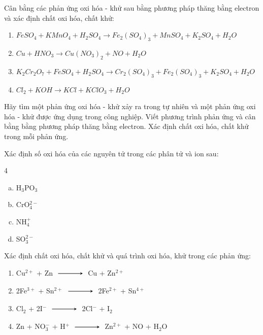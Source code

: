 	\begin{bt}%
		Cân bằng các phản ứng oxi hóa - khử sau bằng phương pháp thăng bằng electron và xác định chất oxi hóa, chất khử:
		\begin{enumerate}
			\item $FeSO_4 + KMnO_4 + H_2SO_4 \longrightarrow Fe_2(SO_4)_3 + MnSO_4 + K_2SO_4 + H_2O$
			\item $Cu + HNO_3 \longrightarrow Cu(NO_3)_2 + NO + H_2O$
			\item $K_2Cr_2O_7 + FeSO_4 + H_2SO_4 \longrightarrow Cr_2(SO_4)_3 + Fe_2(SO_4)_3 + K_2SO_4 + H_2O$
			\item $Cl_2 + KOH \longrightarrow KCl + KClO_3 + H_2O$
		\end{enumerate}
	\end{bt}
	\begin{bt}%
		Hãy tìm một phản ứng oxi hóa - khử xảy ra trong tự nhiên và một phản ứng oxi hóa - khử được ứng dụng trong công nghiệp. Viết phương trình phản ứng và cân bằng bằng phương pháp thăng bằng electron. Xác định chất oxi hóa, chất khử trong mỗi phản ứng.
	\end{bt}
	\begin{bt}%
		Xác định số oxi hóa của các nguyên tử trong các phân tử và ion sau:
		\begin{multicols}{4}
			\begin{enumerate}[a)]
				\item H$_3$PO$_3$
				\item CrO$_4^{2-}$
				\item NH$_4^+$
				\item SO$_3^{2-}$
			\end{enumerate}
		\end{multicols}
		\loigiai{}
	\end{bt}
	\begin{bt}%
		Xác định chất oxi hóa, chất khử và quá trình oxi hóa, khử trong các phản ứng:
		\begin{enumerate}
			\item Cu$^{2+}$ + Zn $\xrightarrow$ Cu + Zn$^{2+}$
			\item 2Fe$^{3+}$ + Sn$^{2+}$ $\xrightarrow$ 2Fe$^{2+}$ + Sn$^{4+}$
			\item Cl$_2$ + 2I$^-$ $\xrightarrow$ 2Cl$^-$ + I$_2$
			\item Zn + NO$_3^-$ + H$^+$ $\xrightarrow$ Zn$^{2+}$ + NO + H$_2$O
		\end{enumerate}
		\loigiai{}
	\end{bt}
